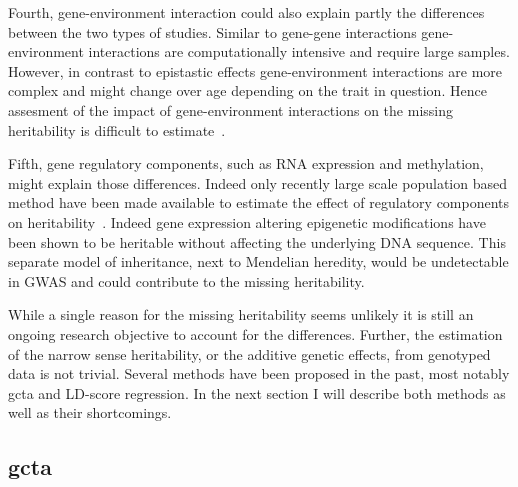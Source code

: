 \documentclass[../header.tex]{subfiles}
\begin{document}
Fourth, gene-environment interaction could also explain partly the differences between the two types of studies.
Similar to gene-gene interactions gene-environment interactions are computationally intensive and require large samples.
However, in contrast to epistastic effects gene-environment interactions are more complex and might change over age depending on the trait in question.
Hence assesment of the impact of gene-environment interactions on the missing heritability is difficult to estimate~\cite{Do2016,Kaprio2012}.

Fifth, gene regulatory components, such as RNA expression and methylation, might explain those differences.
Indeed only recently large scale population based method have been made available to estimate the effect of regulatory components on heritability~\cite{Trerotola2015}.
Indeed gene expression altering epigenetic modifications have been shown to be heritable without affecting the underlying DNA sequence.
This separate model of inheritance, next to Mendelian heredity, would be undetectable in GWAS and could contribute to the missing heritability.

While a single reason for the missing heritability seems unlikely it is still an ongoing research objective to account for the differences.
Further, the estimation of the narrow sense heritability, or the additive genetic effects, from genotyped data is not trivial.
Several methods have been proposed in the past, most notably \acrfull{gcta} and LD-score regression.
In the next section I will describe both methods as well as their shortcomings.

\subsection{\acrfull{gcta}}
\label{sub:gcta}
\end{document}
